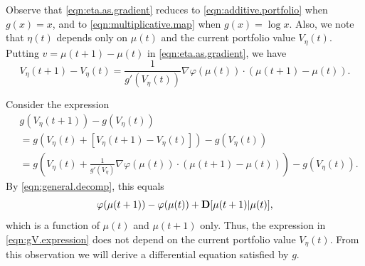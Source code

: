 \documentclass[graybox]{svmult}
\begin{document}
Observe that \eqref{eqn:eta.as.gradient} reduces to \eqref{eqn:additive.portfolio} when $g(x) = x$, and to \eqref{eqn:multiplicative.map} when $g(x) = \log x$. Also, we note that $\eta(t)$ depends only on $\mu(t)$ and the current portfolio value $V_{\eta}(t)$. Putting $v = \mu(t + 1) - \mu(t)$ in \eqref{eqn:eta.as.gradient}, we have
\begin{equation} \label{eqn:for.use}
V_{\eta}(t + 1) - V_{\eta}(t) = \frac{1}{g'(V_{\eta}(t))}\nabla \varphi(\mu(t)) \cdot (\mu(t + 1) - \mu(t)).
\end{equation}

Consider the expression
\begin{equation} \label{eqn:gV.expression}
\begin{split}
& g(V_{\eta}(t + 1)) - g(V_{\eta}(t))\\
&= g\left(V_{\eta}(t) + \left[V_{\eta}(t + 1) - V_{\eta}(t)\right]\right) - g(V_{\eta}(t)) \\
  &= g\left(V_{\eta}(t) + \frac{1}{g'(V_{\eta})}  \nabla \varphi(\mu(t)) \cdot ( \mu(t + 1) - \mu(t))\right) - g(V_{\eta}(t)).
\end{split}
\end{equation}
By \eqref{eqn:general.decomp}, this equals
\[
\varphi(\mu(t + 1)) - \varphi(\mu(t)) + {\bf D}[\mu(t + 1) | \mu(t)],
\]
which is a function of $\mu(t)$ and $\mu(t + 1)$ only. Thus, the expression in \eqref{eqn:gV.expression} does not depend on the current portfolio value $V_{\eta}(t)$. From this observation we will derive a differential equation satisfied by $g$.
\end{document}
